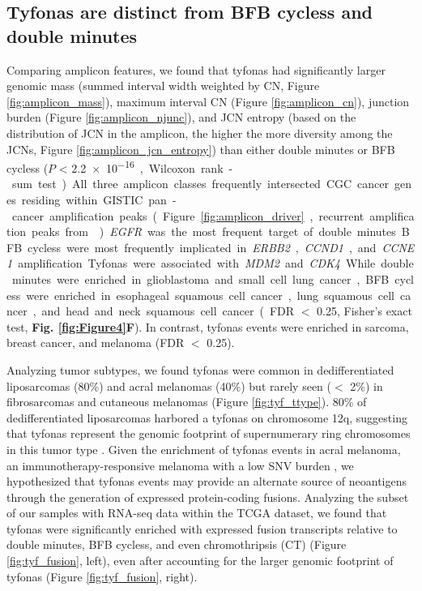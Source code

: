 \documentclass[phd,tocprelim]{cornell}
\begin{document}
\subsection*{Tyfonas are distinct from BFB cycless and double minutes}
Comparing amplicon features, we found that tyfonas had significantly larger genomic mass (summed interval width weighted by CN, Figure \ref{fig:amplicon_mass}), maximum interval CN (Figure \ref{fig:amplicon_cn}), junction burden (Figure \ref{fig:amplicon_njunc}), and JCN entropy (based on the distribution of JCN in the amplicon, the higher the more diversity among the JCNs, Figure \ref{fig:amplicon_jcn_entropy}) than either double minutes or BFB cycless ($P$ < \SI{2.2e-16}, Wilcoxon rank-sum test).  All three amplicon classes frequently intersected CGC cancer genes residing within GISTIC pan-cancer amplification peaks (Figure \ref{fig:amplicon_driver}, recurrent amplification peaks from \cite{Zack:2013f1f}). \textit{EGFR} was the most frequent target of double minutes.  BFB cycless were most frequently implicated in \textit{ERBB2}, \textit{CCND1}, and \textit{CCNE1} amplification. Tyfonas were associated with \textit{MDM2} and \textit{CDK4}. While double minutes were enriched in glioblastoma and small cell lung cancer, BFB cycless were enriched in esophageal squamous cell cancer, lung squamous cell cancer, and head and neck squamous cell cancer (FDR $<$ 0.25, Fisher's exact test, \textbf{Fig. \ref{fig:Figure4}F}). In contrast, tyfonas events were enriched in sarcoma, breast cancer, and melanoma (FDR $<$ 0.25).


Analyzing tumor subtypes, we found tyfonas were common in dedifferentiated liposarcomas (80\%) and acral melanomas (40\%) but rarely seen ($<$ 2\%) in fibrosarcomas and cutaneous melanomas (Figure \ref{fig:tyf_ttype}).    80\% of dedifferentiated liposarcomas harbored a tyfonas on chromosome 12q, suggesting that tyfonas represent the genomic footprint of supernumerary ring chromosomes in this tumor type \cite{Reimann2008-tj}. Given the enrichment of tyfonas events in acral melanoma, an immunotherapy-responsive melanoma with a low SNV burden \cite{Shoushtari2016-de}, we hypothesized that tyfonas events may provide an alternate source of neoantigens through the generation of expressed protein-coding fusions.  Analyzing the subset of our samples with RNA-seq data within the TCGA dataset, we found that tyfonas were significantly enriched with expressed fusion transcripts relative to double minutes, BFB cycless, and even chromothripsis (CT) (Figure \ref{fig:tyf_fusion}, left), even after accounting for the larger genomic footprint of tyfonas (Figure \ref{fig:tyf_fusion}, right).
\end{document}
